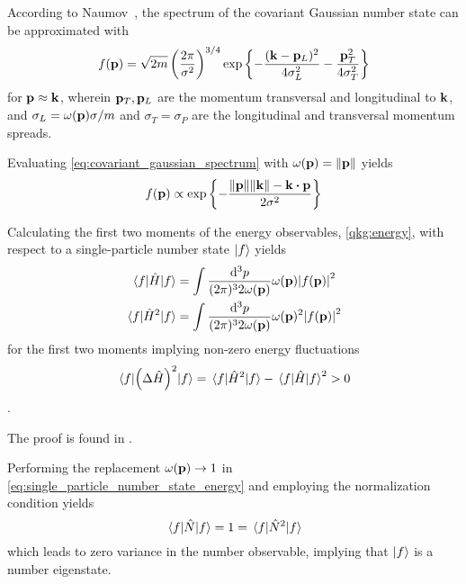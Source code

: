 \begin{example}
	According to Naumov~\cite{Naumov2013}, the spectrum of the covariant Gaussian number state can be approximated with
	\begin{equation}
		f(\vb{p})
		=
		\sqrt{2m}
		\left(
			\frac{2\pi}{\sigma^2}
		\right)^{3/4}
		\exp\left\{
			-
			\frac{(\vb{k}-\vb{p}_L)^2}{4\sigma_L^2}
			-
			\frac{\vb{p}_T^2}{4\sigma_T^2}
		\right\}
	\end{equation}
	for $\vb{p}\approx\vb{k}$, wherein $\vb{p}_T,\vb{p}_L$ are the momentum transversal and longitudinal to $\vb{k}$, and $\sigma_L=\omega(\vb{p})\sigma/m$ and $\sigma_T=\sigma_P$ are the longitudinal and transversal momentum spreads.
\end{example}
\begin{example}
	Evaluating \cref{eq:covariant_gaussian_spectrum} with $\omega(\vb{p})=\norm{\vb{p}}$ yields
	\begin{equation}
		f(\vb{p})
		\propto
		\exp\left\{
			-
			\frac{\norm{\vb{p}}\norm{\vb{k}}-\vb{k}\vdot\vb{p}}{2\sigma^2}
		\right\}
	\end{equation}
\end{example}
\begin{theorem}\label{thm:single_particle_number_state_energy}
	Calculating the first two moments of the energy observables, \cref{qkg:energy}, with respect to a single-particle number state $\ket{f}$ yields
	\begin{align}
		\expval{\hat{H}}{f}
		&=
		\int\frac{\dd[3]{p}}{(2\pi)^32\omega(\vb{p})}
		\omega(\vb{p})
		\abs{f(\vb{p})}^2
		\\
		\expval{\hat{H}^2}{f}
		&=
		\int\frac{\dd[3]{p}}{(2\pi)^32\omega(\vb{p})}
		\omega(\vb{p})^2
		\abs{f(\vb{p})}^2
		\label{eq:single_particle_number_state_energy}
	\end{align}
	for the first two moments implying non-zero energy fluctuations
	\begin{equation}
		\expval{\left(\Delta\hat{H}\right)^2}{f}
		=
		\expval{\hat{H}^2}{f}
		-
		\expval{\hat{H}}{f}^2
		>
		0
	\end{equation}.
\end{theorem}
The proof is found in .

\begin{corollary}
	Performing the replacement $\omega(\vb{p})\to1$ in \cref{eq:single_particle_number_state_energy} and employing the normalization condition yields
	\begin{equation}
		\expval{\hat{N}}{f}
		=
		1
		=
		\expval{\hat{N}^2}{f}
	\end{equation}
	which leads to zero variance in the number observable, implying that $\ket{f}$ is a number eigenstate.
\end{corollary}

